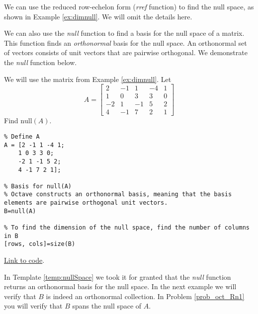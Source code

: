 \documentclass{ximera}
\begin{document}
We can use the reduced row-echelon form (\emph{rref} function) to find the null space, as shown in Example \ref{ex:dimnull}.  We will omit the details here.

We can also use the \emph{null} function to find a basis for the null space of a matrix.  This function finds an \emph{orthonormal} basis for the null space.  An orthonormal set of vectors consists of unit vectors that are pairwise orthogonal.  We demonstrate the \emph{null} function below.

\begin{template}\label{temp:nullSpace}
    We will use the matrix from Example \ref{ex:dimnull}.  Let 
$$A=\begin{bmatrix}2&-1&1&-4&1\\1&0&3&3&0\\-2&1&-1&5&2\\4&-1&7&2&1\end{bmatrix}$$
Find $\mbox{null}(A)$.

\begin{verbatim}
% Define A
A = [2 -1 1 -4 1;
    1 0 3 3 0;
    -2 1 -1 5 2;
    4 -1 7 2 1];

% Basis for null(A)
% Octave constructs an orthonormal basis, meaning that the basis elements are pairwise orthogonal unit vectors.
B=null(A)

% To find the dimension of the null space, find the number of columns in B
[rows, cols]=size(B)
\end{verbatim}

\href{https://sagecell.sagemath.org/?z=eJxFj0FrwzAMhe-B_Id3KbTQjCbr2GHkkLD7LruVHlxXaQ2JVCynhf36yW3ZLDDo83t68gKfNAQmdGXRocWuQVWjRrVF_VEWsFNjg1erzbOvmvxe4w3Nk2xz-w7jeyNlsUDvNCgGieB5HJfdKsMvn9yV4IU1xdknhWNITGdhiZMbcciuNSZyHPiEdHbJLnpw0EgTcXZFwsWFeAtKD_9J2Owzh4Qr-SRRX8qib_-yc_q3wD56vA88BpukQSx-uIOshF6cp_W_iufpQDFLvIzzxIrA6MtiF-VmaxrUfavhh5b96hc072Hf&lang=octave&interacts=eJyLjgUAARUAuQ==}{Link to code}.
\end{template}

In Template \ref{temp:nullSpace} we took it for granted that the \emph{null} function returns an orthonormal basis for the null space.  In the next example we will verify that $B$ is indeed an orthonormal collection.  In Problem \ref{prob_oct_Rn1} you will verify that $B$ spans the null space of $A$.
\end{document}

